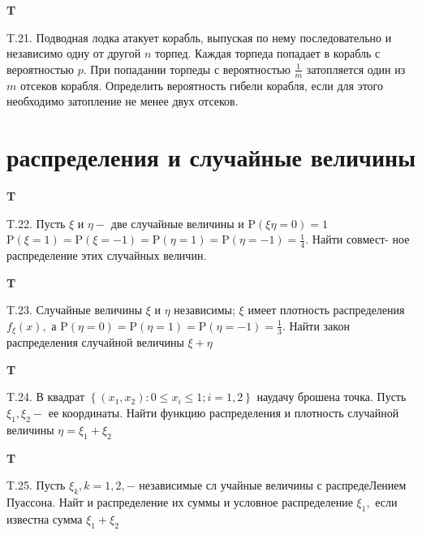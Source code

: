 \documentclass[a4paper,12pt]{article} %
\begin{document}
\begin{example}\textbf{T}

T.21. Подводная лодка атакует корабль, выпуская по нему последовательно и независимо одну от другой $n$ торпед. Каждая торпеда попадает в корабль с вероятностью $p .$ При попадании торпеды с вероятностью $\frac{1}{m}$ затопляется один из $m$ отсеков корабля. Определить вероятность гибели корабля, если для этого необходимо затопление не менее двух отсеков.


\end{example}


\section{распределения и случайные величины}


\begin{example}\textbf{T}

T.22. Пусть $\xi$ и $\eta-$ две случайные величины и $\mathrm{P}(\xi \eta=0)=1$ $\mathrm{P}(\xi=1)=\mathrm{P}(\xi=-1)=\mathrm{P}(\eta=1)=\mathrm{P}(\eta=-1)=\frac{1}{4} .$ Найти совмест-
ное распределение этих случайных величин.


\end{example}


\begin{example}\textbf{T}

T.23. Случайные величины $\xi$ и $\eta$ независимы; $\xi$ имеет плотность распределения $f_{\xi}(x),$ а $\mathrm{P}(\eta=0)=\mathrm{P}(\eta=1)=\mathrm{P}(\eta=-1)=\frac{1}{3} .$ Найти закон
распределения случайной величины $\xi+\eta$


\end{example}




\begin{example}\textbf{T}

T.24. В квадрат $\left\{\left(x_{1}, x_{2}\right): 0 \leqslant x_{i} \leqslant 1 ; i=1,2\right\}$ наудачу брошена точка. Пусть $\xi_{1}, \xi_{2}-$ ее координаты. Найти функцию распределения и плотность случайной величины $\eta=\xi_{1}+\xi_{2}$


\end{example}


\begin{example}\textbf{T}

T.25. Пусть $\xi_{k}, k=1,2,-$ независимые сл учайные величины с распредеЛением Пуассона. Найт и распределение их суммы и условное распределение $\xi_{1},$ если известна сумма $\xi_{1}+\xi_{2}$


\end{example}
\end{document}
